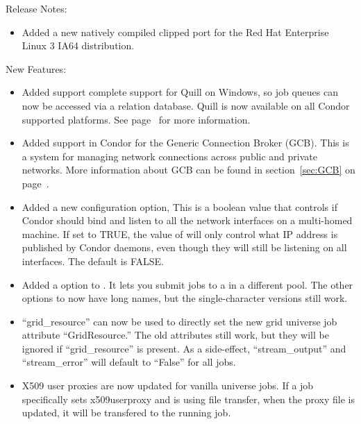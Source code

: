 \noindent Release Notes:

\begin{itemize}

\item Added a new natively compiled clipped port for the Red Hat
Enterprise Linux 3 IA64 distribution.

\end{itemize}

\noindent New Features:

\begin{itemize}

\item Added support complete support for Quill on Windows, so job queues can
now be accessed via a relation database.  Quill is now available on all Condor
supported platforms.  See page~\pageref{sec:Quill} for more information.

\item Added support in Condor for the Generic Connection Broker
  (GCB).
  This is a system for managing network connections across public and
  private networks.
  More information about GCB can be found in section~\ref{sec:GCB} on
  page~\pageref{sec:GCB}.

\item Added a new configuration option, 
  This is a boolean value that controls if Condor should bind and
  listen to all the network interfaces on a multi-homed machine.
  If set to TRUE, the value of  will only
  control what IP address is published by Condor daemons, even though
  they will still be listening on all interfaces.
  The default is FALSE.

\item Added a  option to . It lets you submit
jobs to a  in a different pool. The other options to
 now have long names, but the single-character versions
still work.

\item ``grid\_resource'' can now be used to directly set the new grid
universe job attribute ``GridResource.'' The old attributes still work,
but they will be ignored if ``grid\_resource'' is present. As a
side-effect, ``stream\_output'' and ``stream\_error'' will default to
``False'' for all jobs.

\item X509 user proxies are now updated for vanilla universe jobs.   If
a job specifically sets x509userproxy and is using file transfer, when
the proxy file is updated, it will be transfered to the running job.


\end{itemize}
